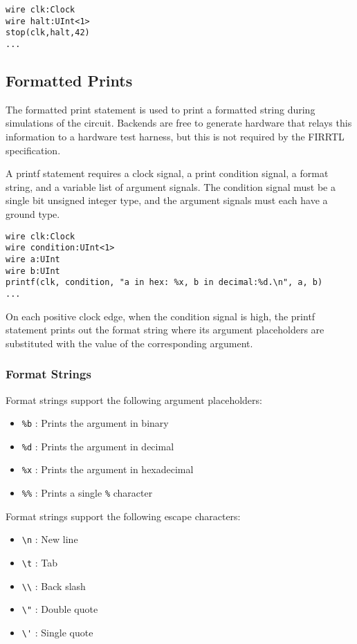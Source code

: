 \documentclass[12pt]{article}
\begin{document}
\begin{lstlisting}
wire clk:Clock
wire halt:UInt<1>
stop(clk,halt,42)
...
\end{lstlisting}

\subsection{Formatted Prints}
The formatted print statement is used to print a formatted string during simulations of the circuit. Backends are free to generate hardware that relays this information to a hardware test harness, but this is not required by the FIRRTL specification.

A printf statement requires a clock signal, a print condition signal, a format string, and a variable list of argument signals. The condition signal must be a single bit unsigned integer type, and the argument signals must each have a ground type.

\begin{lstlisting}
wire clk:Clock
wire condition:UInt<1>
wire a:UInt
wire b:UInt
printf(clk, condition, "a in hex: %x, b in decimal:%d.\n", a, b)
...
\end{lstlisting}

On each positive clock edge, when the condition signal is high, the printf statement prints out the format string where its argument placeholders are substituted with the value of the corresponding argument.

\subsubsection{Format Strings}

Format strings support the following argument placeholders:
\begin{itemize}
\item \verb|%b| : Prints the argument in binary
\item \verb|%d| : Prints the argument in decimal
\item \verb|%x| : Prints the argument in hexadecimal
\item \verb|%%| : Prints a single \verb|%| character
\end{itemize}

Format strings support the following escape characters:
\begin{itemize}
\item \verb|\n| : New line
\item \verb|\t| : Tab
\item \verb|\\| : Back slash
\item \verb|\"| : Double quote
\item \verb|\'| : Single quote
\end{itemize}
\end{document}
